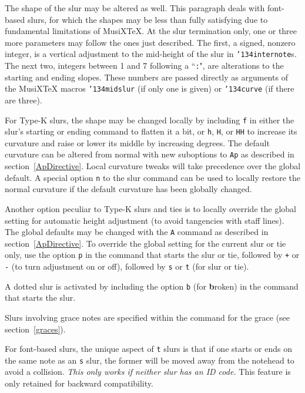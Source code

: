 \documentclass[11pt]{article}
\def\MusiXTeX{MusiX\TeX}
\def\bs{{\tt\char'134}}
\def\newfrom{2.59}  %
\def\NEW#1{\ifdim#1 pt<\newfrom pt\else%
\marginpar{\fbox{#1}}\fi}
\begin{document}
The shape of the slur may be altered as well\NEW{2.1}. This paragraph
deals with font-based slurs, for which the shapes may be less 
than fully satisfying due to fundamental limitations of \MusiXTeX.
At the slur termination only, one or three
more parameters may follow the ones just described.  The first, a signed,
nonzero
integer, is a vertical adjustment to the mid-height of the slur in  
\bs{\tt internote}s.  The next two, integers between 1 and 7 following a 
``{\tt :}", are alterations to the starting and ending slopes.
These numbers are
passed directly as arguments of the \MusiXTeX{} macros \bs{\tt midslur}
(if only
one is given) or \bs{\tt curve} (if there are three).

For \NEW{2.4}Type-K slurs,
the shape may be changed locally by including {\tt f} in either the
slur's starting or ending command to flatten it a bit, or {\tt h},
{\tt H}, or {\tt HH} to
increase its curvature and raise or lower its middle by increasing degrees.
The default \NEW{2.5}curvature can be altered from normal 
with new suboptions 
to {\tt Ap} as described in section~\ref{ApDirective}. Local 
curvature tweaks will take precedence over the global default. A special 
option {\tt n} to the slur command can be used to locally restore the normal
curvature if the default curvature has been globally changed.

Another option peculiar to Type-K slurs and ties is to locally 
override the global
setting for automatic height adjustment (to avoid tangencies with staff
lines).  The global defaults may be changed with the {\tt A} command as
described in section~\ref{ApDirective}. To
override the global setting for the current slur or tie only, use
the option {\tt p} in the command that starts the slur or tie,
followed by {\tt +} or {\tt -} (to turn adjustment
on or off), followed by {\tt s} or {\tt t} (for slur or tie). 

A dotted \NEW{1.41} slur is activated by including the option {\tt b} (for
{\bf b}roken) in the command that starts the slur. 

Slurs involving grace notes are specified within the command for the grace 
(see section~\ref{graces}).

For font-based slurs, the unique aspect of {\tt t} slurs is that if one
starts or ends on the same
note as an {\tt s} slur, the former will be moved away from the notehead to 
avoid a collision.  {\it This only works if neither slur has an ID code.}
This feature is only retained for backward compatibility.
\end{document}
